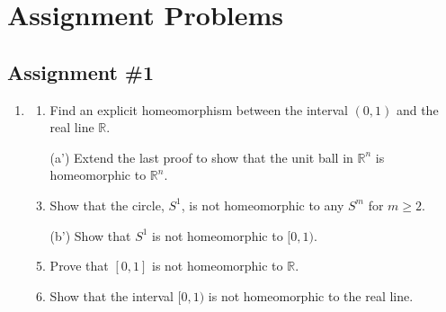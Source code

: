 \documentclass[notoc,notitlepage]{tufte-book}
\begin{document}

\appendix

\chapter{Assignment Problems}%
\label{chp:assignment_problems}

\section{Assignment \#1}%
\label{sec:assignment_1}

\begin{enumerate}
  \item 
    \begin{enumerate}
      \item Find an explicit homeomorphism between the interval $(0, 1)$ and the real line
        $\mathbb{R}$.
      \item[(a')] Extend the last proof to show that the unit ball in $\mathbb{R}^n$ is
        homeomorphic to $\mathbb{R}^n$.
      \item Show that the circle, $S^1$, is not homeomorphic to any $S^m$ for
        $m \geq 2$.
      \item[(b')] Show that $S^1$ is not homeomorphic to $[0, 1)$.
      \item Prove that $[0, 1]$ is not homeomorphic to $\mathbb{R}$.
      \item Show that the interval $[0, 1)$ is not homeomorphic to the real line.
    \end{enumerate}


\end{enumerate}
\end{document}
